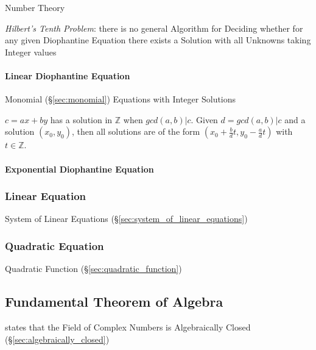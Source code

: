 \fist Number Theory

\emph{Hilbert's Tenth Problem}: there is no general Algorithm for Deciding
whether for any given Diophantine Equation there exists a Solution with all
Unknowns taking Integer values



\paragraph{Linear Diophantine Equation}
\label{sec:linear_diophantine}\hfill

Monomial (\S\ref{sec:monomial}) Equations with Integer Solutions

$c = ax + by$ has a solution in $\mathbb{Z}$ when $gcd(a,b)|c$. Given
$d=gcd(a,b)|c$ and a solution $(x_0, y_0)$, then all solutions are of
the form $(x_0 + \frac{b}{d}t, y_0 - \frac{a}{d}t)$ with $t \in
\mathbb{Z}$.



\paragraph{Exponential Diophantine Equation}\hfill
\label{sec:exponential_diophantine}



\subsubsection{Linear Equation}\label{sec:linear_equation}

System of Linear Equations (\S\ref{sec:system_of_linear_equations})



\subsubsection{Quadratic Equation}\label{sec:quadratic_equation}

Quadratic Function (\S\ref{sec:quadratic_function})



\subsection{Fundamental Theorem of Algebra}
\label{sec:fundamental_algebra_theorem}

states that the Field of Complex Numbers is Algebraically Closed
(\S\ref{sec:algebraically_closed})

